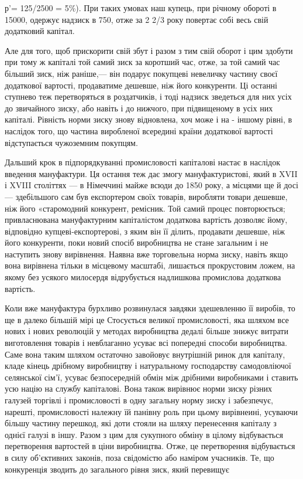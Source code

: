 \parcont{}  %
р'= 125/2500 = 5\%). При таких умовах наш купець, при річному
обороті в 15000, одержує надзиск в 750, отже за 2 2/3 року повертає собі весь свій додатковий капітал.

Але для того, щоб
прискорити свій збут і разом з тим свій оборот і цим здобути при тому ж капіталі той самий зиск за коротший час, отже, за
той самий час більший зиск, ніж раніше,— він подарує покупцеві невеличку частину своєї додаткової вартості, продаватиме
дешевше, ніж його конкуренти.
Ці останні ступнево теж перетворяться в роздатчиків, і тоді надзиск зведеться для них усіх до звичайного зиску, або навіть і
до нижчого, при підвищеному в усіх них капіталі. Рівність норми зиску знову відновлена, хоч може і на - іншому рівні, в
наслідок того, що частина виробленої всередині країни додаткової вартості відступається чужоземним покупцям.

Дальший крок в
підпорядкуванні промисловості капіталові настає в наслідок введення мануфактури. Ця остання теж дає змогу мануфактуристові,
який в XVII і XVIII століттях — в Німеччині майже всюди до 1850 року, а місцями ще й досі — здебільшого сам був експортером
своїх товарів, виробляти товари дешевше, ніж його «старомодний конкурент, ремісник. Той самий процес повторюється;
привласнювана мануфактурним капіталістом додаткова вартість дозволяє йому, відповідно купцеві-експортерові, з яким він її
ділить, продавати дешевше, ніж його конкуренти, поки новий спосіб виробництва не стане загальним і не наступить знову
вирівнення. Наявна вже торговельна норма зиску, навіть якщо вона вирівнена тільки в місцевому масштабі, лишається
прокрустовим ложем, на якому без усякого милосердя відрубується надлишкова промислова додаткова вартість.

Коли вже мануфактура бурхливо розвинулася завдяки здешевленню її виробів, то ще в далеко більшій мірі це Стосується великої
промисловості, яка шляхом все нових і нових революцій у методах виробництва дедалі більше знижує витрати виготовлення
товарів і невблаганно усуває всі попередні способи виробництва. Саме вона таким шляхом остаточно завойовує внутрішній ринок
для капіталу, кладе кінець дрібному виробництву і натуральному господарству самодовліючої селянської сім’ї, усуває
безпосередній обмін між дрібними виробниками і ставить усю націю на службу капіталові. Вона також вирівнює норми зиску
різних галузей торгівлі і промисловості в одну загальну норму зиску і забезпечує, нарешті, промисловості належну їй панівну
роль при цьому вирівнеині, усуваючи більшу частину перешкод, які доти стояли на шляху перенесення капіталу з однієї галузі в
іншу. Разом з цим для сукупного обміну в цілому відбувається перетворення вартостей в ціни виробництва. Отже, це
перетворення відбувається в силу об’єктивних законів, поза свідомістю або наміром учасників. Те, що конкуренція зводить до
загального рівня зиск, який перевищує
\parbreak{}  %
